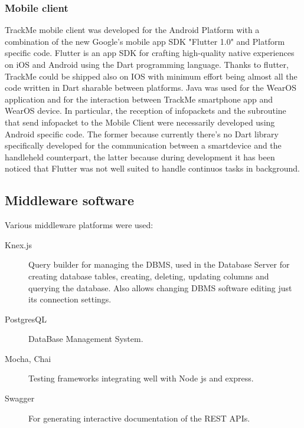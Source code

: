 \documentclass[../main.tex]{subfiles}
\begin{document}
\subsubsection{Mobile client}

TrackMe mobile client was developed for the Android Platform with a combination of the new Google's mobile app SDK "Flutter 1.0" and Platform specific code.
Flutter is an app SDK for crafting high-quality native experiences on iOS and Android using the Dart programming language.
Thanks to flutter, TrackMe could be shipped also on IOS with minimum effort being almost all the code written in Dart sharable between platforms. 
 Java was used for the WearOS application and for the interaction between TrackMe smartphone app and WearOS device.
 In particular, the reception of infopackets and the subroutine that send infopacket to the Mobile Client were necessarily developed using Android specific code.
 The former because currently there's no Dart library specifically developed for the communication between a smartdevice and the handleheld counterpart, 
 the latter because during development it has been noticed that Flutter was not well suited to handle continuos tasks in background.





\subsection{Middleware software}

Various middleware platforms were used:

{\begin{description}
	\item [Knex.js] Query builder for managing the DBMS, used in the Database Server for creating database tables, creating, deleting, updating columns and querying the database. Also allows changing DBMS software editing just its connection settings.
	\item [PostgresQL] DataBase Management System.
	\item [Mocha, Chai] Testing frameworks integrating well with Node js and express.
	\item [Swagger] For generating interactive documentation of the REST APIs.
\end{description}}
\end{document}
